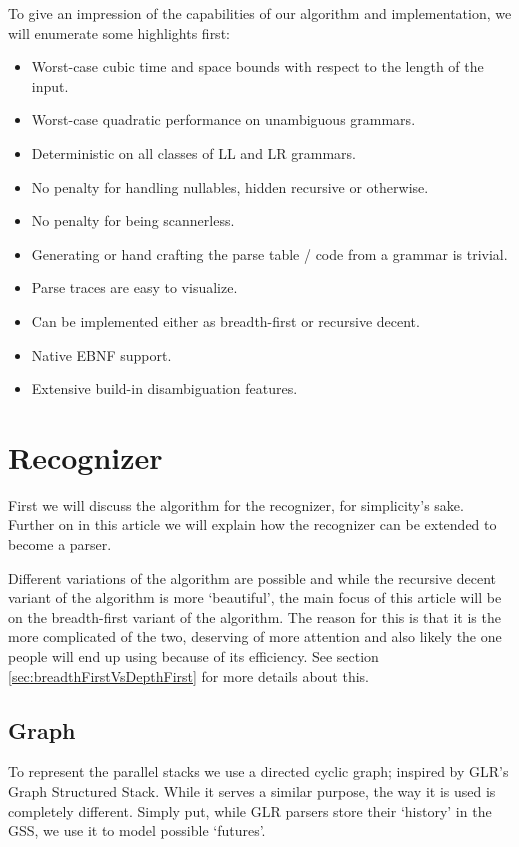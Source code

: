 \documentclass[a4paper,10pt]{article}
\begin{document}
To give an impression of the capabilities of our algorithm and implementation, we will enumerate some highlights first:
\begin{itemize}
 \setlength{\itemsep}{0pt}
 \setlength{\parskip}{0pt}
 \setlength{\parsep}{0pt}
 
 \item Worst-case cubic time and space bounds with respect to the length of the input.
 \item Worst-case quadratic performance on unambiguous grammars.
 \item Deterministic on all classes of LL and LR\cite{knuth1965translation} grammars.
 \item No penalty for handling nullables, hidden recursive or otherwise.
 \item No penalty for being scannerless.
 \item Generating or hand crafting the parse table / code from a grammar is trivial.
 \item Parse traces are easy to visualize.
 \item Can be implemented either as breadth-first or recursive decent.
 \item Native EBNF support.
 \item Extensive build-in disambiguation features.
\end{itemize}

\pagebreak
\section{Recognizer}

First we will discuss the algorithm for the recognizer, for simplicity's sake. Further on in this article we will explain how the recognizer can be extended to become a parser.

Different variations of the algorithm are possible and while the recursive decent variant of the algorithm is more `beautiful', the main focus of this article will be on the breadth-first variant of the algorithm. The reason for this is that it is the more complicated of the two, deserving of more attention and also likely the one people will end up using because of its efficiency. See section \ref{sec:breadthFirstVsDepthFirst} for more details about this.

\subsection{Graph}

To represent the parallel stacks we use a directed cyclic graph; inspired by GLR's Graph Structured Stack. While it serves a similar purpose, the way it is used is completely different. Simply put, while GLR parsers store their `history' in the GSS\cite{tomita1985efficient}, we use it to model possible `futures'.
\end{document}
